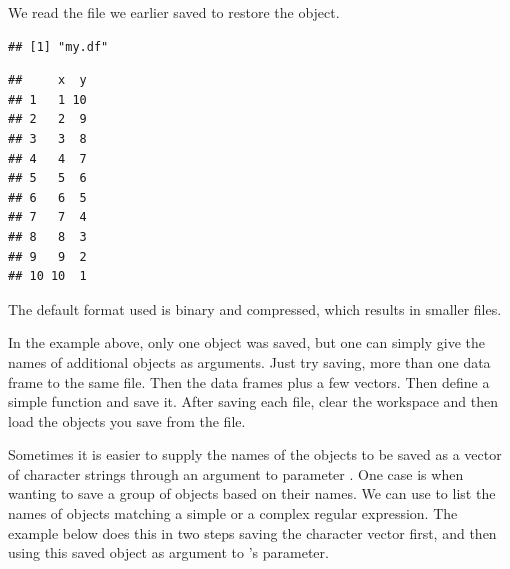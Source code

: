 \documentclass[krantz2]{krantz}\usepackage{knitr}%
\begin{document}
We read the file we earlier saved to restore the object.
\begin{knitrout}\footnotesize
{}\color{fgcolor}\begin{kframe}
\begin{alltt}
\hlstd{(} \hlstd{=} \hlstd{)}
\hlstd{(} \hlstd{=} \hlstd{)}
\end{alltt}
\begin{verbatim}
## [1] "my.df"
\end{verbatim}
\begin{alltt}
\end{alltt}
\begin{verbatim}
##     x  y
## 1   1 10
## 2   2  9
## 3   3  8
## 4   4  7
## 5   5  6
## 6   6  5
## 7   7  4
## 8   8  3
## 9   9  2
## 10 10  1
\end{verbatim}
\end{kframe}
\end{knitrout}

The default format used is binary and compressed, which results in smaller files.

\begin{playground}
In the example above, only one object was saved, but one can simply give the names of additional objects as arguments. Just try saving, more than one data frame to the same file. Then the data frames plus a few vectors. Then define a simple function and save it. After saving each file, clear the workspace and then load the objects you save from the file.
\end{playground}

Sometimes it is easier to supply the names of the objects to be saved as a vector of character strings through an argument to parameter . One case is when wanting to save a group of objects based on their names. We can use  to list the names of objects matching a simple  or a complex regular expression. The example below does this in two steps saving the character vector first, and then using this saved object as argument to 's  parameter.

\begin{knitrout}\footnotesize
{}\color{fgcolor}\begin{kframe}
\begin{alltt}
 \hlkwb{<-} \hlstd{(} \hlstd{=} \hlstd{)}
\hlstd{(}   \hlstd{=} \hlstd{)}
\end{alltt}
\end{kframe}
\end{knitrout}
\end{document}
